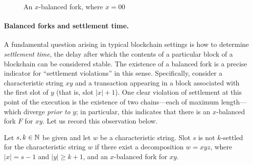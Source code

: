 \begin{figure}[ht]
  \centering
  \caption{An $x$-balanced fork, where $x=00$}
  \label{fig:x-balanced}
\end{figure}


\paragraph{Balanced forks and settlement time.}
A fundamental question arising in typical blockchain settings is how
to determine \emph{settlement time}, the delay after which the
contents of a particular block of a blockchain can be considered
stable. The existence of a balanced fork is a precise indicator for
``settlement violations'' in this sense. Specifically, consider a
characteristic string $xy$ and a transaction appearing in a block
associated with the first slot of $y$ (that is, slot $|x| + 1$). One
clear violation of settlement at this point of the execution is the
existence of two chains---each of maximum length---which diverge
\emph{prior to $y$}; in particular, this indicates that there is an
$x$-balanced fork $F$ for $xy$. Let us record this observation below.

\begin{observation}\label{obs:settlement-balanced-fork}
  Let $s, k \in \mathbb{N}$ be given and 
  let $w$ be a characteristic string. 
  Slot $s$ is not $k$-settled for the characteristic string $w$ 
  if 
  there exist a decomposition $w = xyz$, 
  where $|x| = s - 1$ and $|y| \geq k+1$, 
  and an $x$-balanced fork for $xy$. 
\end{observation}

